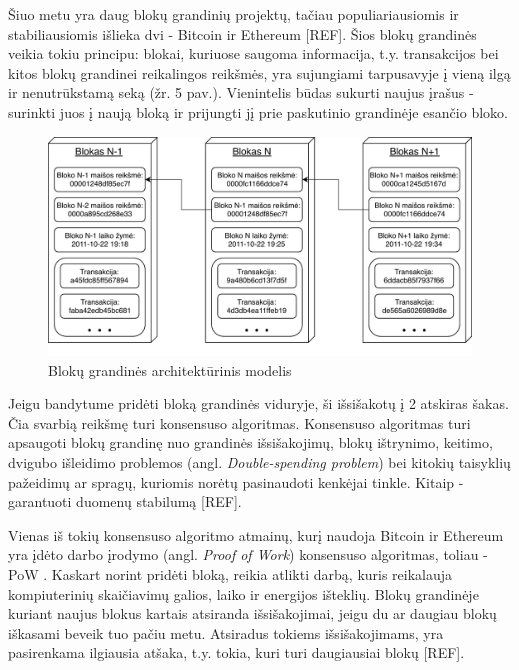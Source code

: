 Šiuo metu yra daug blokų grandinių projektų, tačiau populiariausiomis ir stabiliausiomis išlieka dvi - Bitcoin ir Ethereum [REF]. Šios blokų grandinės veikia tokiu principu: blokai, kuriuose saugoma informacija, t.y. transakcijos bei kitos blokų grandinei reikalingos reikšmės, yra sujungiami tarpusavyje į vieną ilgą ir nenutrūkstamą seką (žr. 5 pav.). Vienintelis būdas sukurti naujus įrašus - surinkti juos į naują bloką ir prijungti jį prie paskutinio grandinėje esančio bloko.

\begin{figure}[H]
    \centering
    \includegraphics[scale=0.85]{images/block-chain-architecture}
    \caption{Blokų grandinės architektūrinis modelis}
\end{figure}





Jeigu bandytume pridėti bloką grandinės viduryje, ši išsišakotų į 2 atskiras šakas. Čia svarbią reikšmę turi konsensuso algoritmas. Konsensuso algoritmas turi apsaugoti blokų grandinę nuo grandinės išsišakojimų, blokų ištrynimo, keitimo, dvigubo išleidimo problemos (angl. \textit{Double-spending problem}) bei kitokių taisyklių pažeidimų ar spragų, kuriomis norėtų pasinaudoti kenkėjai tinkle. Kitaip - garantuoti duomenų stabilumą [REF].

Vienas iš tokių konsensuso algoritmo atmainų, kurį naudoja Bitcoin ir Ethereum yra įdėto darbo įrodymo (angl. \textit{Proof of Work}) konsensuso algoritmas, toliau - PoW \cite{gervais2016security}. Kaskart norint pridėti bloką, reikia atlikti darbą, kuris reikalauja kompiuterinių skaičiavimų galios, laiko ir energijos išteklių. Blokų grandinėje kuriant naujus blokus kartais atsiranda išsišakojimai, jeigu du ar daugiau blokų iškasami beveik tuo pačiu metu. Atsiradus tokiems išsišakojimams, yra pasirenkama ilgiausia atšaka, t.y. tokia, kuri turi daugiausiai blokų [REF]. 

